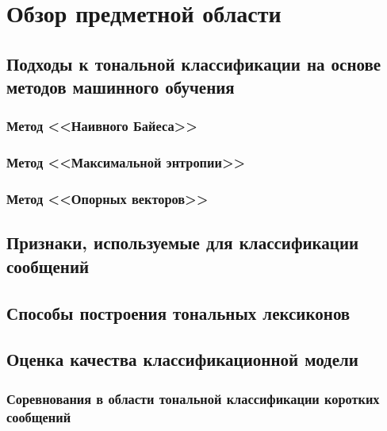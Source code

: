 \newpage
\section{Обзор предметной области}

    \subsection{Подходы к тональной классификации на основе методов машинного обучения}
        \subsubsection{Метод <<Наивного Байеса>>}
        \subsubsection{Метод <<Максимальной энтропии>>}
        \subsubsection{Метод <<Опорных векторов>>}

    \subsection{Признаки, используемые для классификации сообщений}
    \subsection{Способы построения тональных лексиконов}

    \subsection{Оценка качества классификационной модели}
        \subsubsection{Соревнования в области тональной классификации коротких сообщений}

